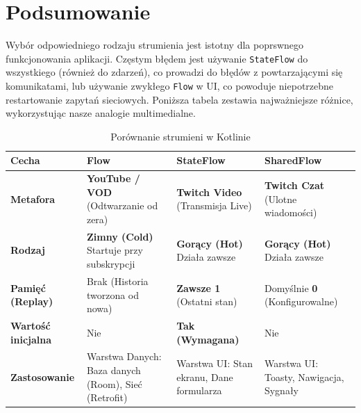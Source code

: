 \section{Podsumowanie}

Wybór odpowiedniego rodzaju strumienia jest istotny dla poprswnego funkcjonowania aplikacji. Częstym błędem jest używanie \texttt{StateFlow} do wszystkiego (również do zdarzeń), co prowadzi do błędów z powtarzającymi się komunikatami, lub używanie zwykłego \texttt{Flow} w UI, co powoduje niepotrzebne restartowanie zapytań sieciowych. Poniższa tabela zestawia najważniejsze różnice, wykorzystując nasze analogie multimedialne.

\begin{table}[h]
\centering
\renewcommand{\arraystretch}{1.5}
\begin{tabular}{|p{3cm}|p{3.5cm}|p{3.5cm}|p{3.5cm}|}
\hline
\textbf{Cecha} & \textbf{Flow} & \textbf{StateFlow} & \textbf{SharedFlow} \\ \hline
\textbf{Metafora} & \textbf{YouTube / VOD} \newline (Odtwarzanie od zera) & \textbf{Twitch Video} \newline (Transmisja Live) & \textbf{Twitch Czat} \newline (Ulotne wiadomości) \\ \hline
\textbf{Rodzaj} & \textbf{Zimny (Cold)} \newline Startuje przy subskrypcji & \textbf{Gorący (Hot)} \newline Działa zawsze & \textbf{Gorący (Hot)} \newline Działa zawsze \\ \hline
\textbf{Pamięć (Replay)} & Brak (Historia tworzona od nowa) & \textbf{Zawsze 1} \newline (Ostatni stan) & Domyślnie \textbf{0} \newline (Konfigurowalne) \\ \hline
\textbf{Wartość inicjalna} & Nie & \textbf{Tak (Wymagana)} & Nie \\ \hline
\textbf{Zastosowanie} & Warstwa Danych: \newline Baza danych (Room), Sieć (Retrofit) & Warstwa UI: \newline Stan ekranu, Dane formularza & Warstwa UI: \newline Toasty, Nawigacja, Sygnały \\ \hline
\end{tabular}
\caption{Porównanie strumieni w Kotlinie}
\end{table}


